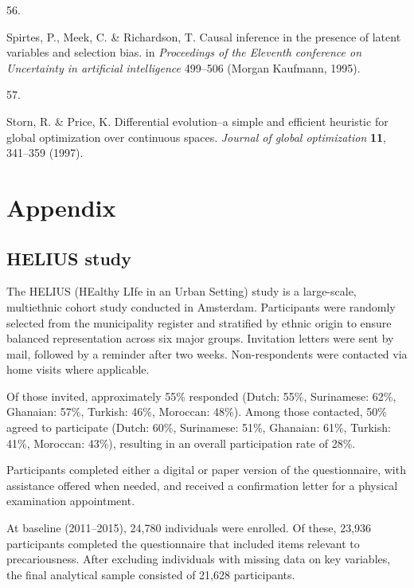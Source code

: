 \documentclass[
]{article}
\newlength{\cslhangindent}
\newlength{\csllabelwidth}
\newenvironment{CSLReferences}[2] %
 {\begin{list}{}{%
  \setlength{\itemindent}{0pt}
  \setlength{\leftmargin}{0pt}
  \setlength{\parsep}{0pt}
  \ifodd #1
   \setlength{\leftmargin}{\cslhangindent}
   \setlength{\itemindent}{-1\cslhangindent}
  \fi
  \setlength{\itemsep}{#2\baselineskip}}}
 {\end{list}}
\newcommand{\CSLLeftMargin}[1]{\parbox[t]{\csllabelwidth}{\strut#1\strut}}
\newcommand{\CSLRightInline}[1]{\parbox[t]{\linewidth - \csllabelwidth}{\strut#1\strut}}
\begin{document}
\begin{CSLReferences}{0}{0}
\CSLLeftMargin{56. }%
\CSLRightInline{Spirtes, P., Meek, C. \& Richardson, T. Causal inference
in the presence of latent variables and selection bias. in
\emph{Proceedings of the {Eleventh} conference on {Uncertainty} in
artificial intelligence} 499--506 (Morgan Kaufmann, 1995).}

\CSLLeftMargin{57. }%
\CSLRightInline{Storn, R. \& Price, K. Differential evolution--a simple
and efficient heuristic for global optimization over continuous spaces.
\emph{Journal of global optimization} \textbf{11}, 341--359 (1997).}

\end{CSLReferences}

\section{Appendix}\label{sec-appendix}

\subsection{HELIUS study}\label{sec-helius}

The HELIUS (HEalthy LIfe in an Urban Setting) study is a large-scale,
multiethnic cohort study conducted in Amsterdam. Participants were
randomly selected from the municipality register and stratified by
ethnic origin to ensure balanced representation across six major groups.
Invitation letters were sent by mail, followed by a reminder after two
weeks. Non-respondents were contacted via home visits where applicable.

Of those invited, approximately 55\% responded (Dutch: 55\%, Surinamese:
62\%, Ghanaian: 57\%, Turkish: 46\%, Moroccan: 48\%). Among those
contacted, 50\% agreed to participate (Dutch: 60\%, Surinamese: 51\%,
Ghanaian: 61\%, Turkish: 41\%, Moroccan: 43\%), resulting in an overall
participation rate of 28\%.

Participants completed either a digital or paper version of the
questionnaire, with assistance offered when needed, and received a
confirmation letter for a physical examination appointment.

At baseline (2011--2015), 24,780 individuals were enrolled. Of these,
23,936 participants completed the questionnaire that included items
relevant to precariousness. After excluding individuals with missing
data on key variables, the final analytical sample consisted of 21,628
participants.
\end{document}
